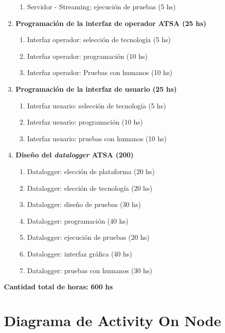 \documentclass[
12pt,
spanish,
singlespacing,
parskip,
headsepline,]{article}
\begin{document}
\begin{enumerate}
\begin{enumerate}
		\item Servidor - Streaming: ejecución de pruebas (5 hs)
	\end{enumerate}
	\item \textbf{Programación de la interfaz de operador ATSA (25 hs)}
	\begin{enumerate}
		\item Interfaz operador: selección de tecnología (5 hs)
		\item Interfaz operador: programación (10 hs)
		\item Interfaz operador: Pruebas con humanos (10 hs)
	\end{enumerate}
	\item \textbf{Programación de la interfaz de usuario (25 hs)}
	\begin{enumerate}
		\item Interfaz usuario: selección de tecnología (5 hs)
		\item Interfaz usuario: programación (10 hs)
		\item Interfaz usuario: pruebas con humanos (10 hs)
	\end{enumerate}
	\item \textbf{Diseño del \emph{datalogger} ATSA (200)}
	\begin{enumerate}
		\item Datalogger: elección de plataforma (20 hs)
		\item Datalogger: elección de tecnología (20 hs)
		\item Datalogger: diseño de pruebas (30 hs)
		\item Datalogger: programación (40 hs)
		\item Datalogger: ejecución de pruebas (20 hs)
		\item Datalogger: interfaz gráfica (40 hs)
		\item Datalogger: pruebas con humanos (30 hs)
	\end{enumerate}
\end{enumerate}

\textbf{Cantidad total de horas: 600 hs}

\section{Diagrama de Activity On Node}
\end{document}
